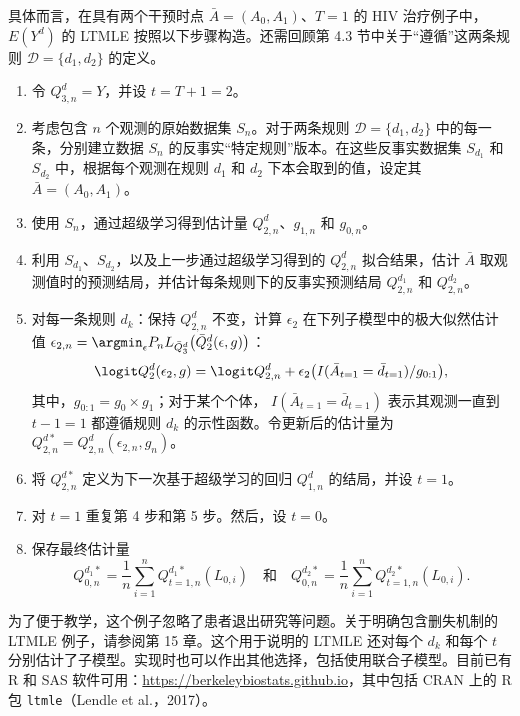 具体而言，在具有两个干预时点 $\bar A=(A_0,A_1)$、$T=1$ 的 HIV 治疗例子中，$E(Y^d)$ 的 LTMLE 按照以下步骤构造。还需回顾第 4.3 节中关于“遵循”这两条规则 $\mathcal D=\{d_1,d_2\}$ 的定义。
\begin{enumerate}
 \item 令 $Q_{3,n}^d=Y$，并设 $t=T+1=2$。
 \item 考虑包含 $n$ 个观测的原始数据集 $S_n$。对于两条规则 $\mathcal D=\{d_1,d_2\}$ 中的每一条，分别建立数据 $S_n$ 的反事实“特定规则”版本。在这些反事实数据集 $S_{d_1}$ 和 $S_{d_2}$ 中，根据每个观测在规则 $d_1$ 和 $d_2$ 下本会取到的值，设定其 $\bar A=(A_0,A_1)$。
 \item 使用 $S_n$，通过超级学习得到估计量 $Q_{2,n}^d$、$g_{1,n}$ 和 $g_{0,n}$。
 \item 利用 $S_{d_1}$、$S_{d_2}$，以及上一步通过超级学习得到的 $Q_{2,n}^d$ 拟合结果，估计 $\bar A$ 取观测值时的预测结局，并估计每条规则下的反事实预测结局 $Q_{2,n}^{d_1}$ 和 $Q_{2,n}^{d_2}$。
 \item 对每一条规则 $d_k$：保持 $Q_{2,n}^d$ 不变，计算 $\epsilon_2$ 在下列子模型中的极大似然估计值
 $\epsilon_{2,n}=\argmin_\epsilon P_nL_{\bar Q_3^d}\bigl(\bar Q_2^d(\epsilon,g)\bigr)$：
 \[
  \logit Q_2^d(\epsilon_2,g)
  =\logit Q_{2,n}^d+
  \epsilon_2\bigl(I(\bar A_{t=1}=\bar d_{t=1})/g_{0:1}\bigr),
 \]
 其中，$g_{0:1}=g_0\times g_1$；对于某个个体，
 $I(\bar A_{t=1}=\bar d_{t=1})$ 表示其观测一直到 $t-1=1$ 都遵循规则 $d_k$ 的示性函数。令更新后的估计量为
 $Q_{2,n}^{d*}=Q_{2,n}^d(\epsilon_{2,n},g_n)$。
 \item 将 $Q_{2,n}^{d*}$ 定义为下一次基于超级学习的回归 $Q_{1,n}^d$ 的结局，并设 $t=1$。
 \item 对 $t=1$ 重复第 4 步和第 5 步。然后，设 $t=0$。
 \item 保存最终估计量
 \[
  Q_{0,n}^{d_1*}=\frac1n\sum_{i=1}^n Q_{t=1,n}^{d_1*}(L_{0,i})
  \quad\text{和}\quad
  Q_{0,n}^{d_2*}=\frac1n\sum_{i=1}^n Q_{t=1,n}^{d_2*}(L_{0,i}).
 \]
\end{enumerate}

为了便于教学，这个例子忽略了患者退出研究等问题。关于明确包含删失机制的 LTMLE 例子，请参阅第 15 章。这个用于说明的 LTMLE 还对每个 $d_k$ 和每个 $t$ 分别估计了子模型。实现时也可以作出其他选择，包括使用联合子模型。目前已有 R 和 SAS 软件可用：\url{https://berkeleybiostats.github.io}，其中包括 CRAN 上的 R 包 \texttt{ltmle}（Lendle et al.，2017）。

